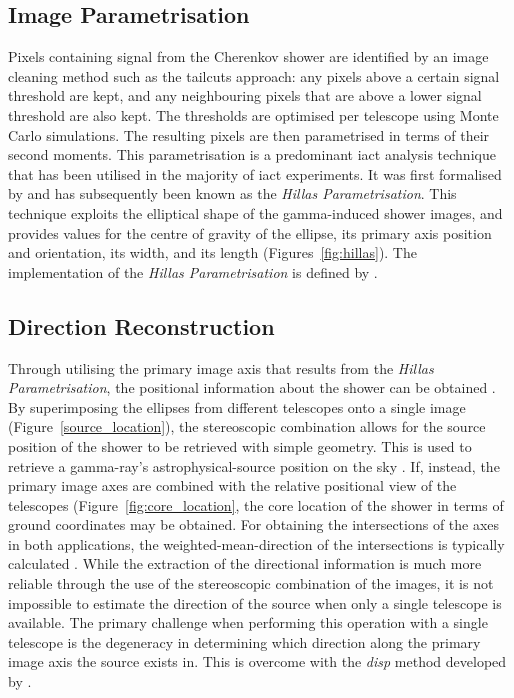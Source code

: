 \subsection{Image Parametrisation} \label{section:image_parametrisation}

Pixels containing signal from the Cherenkov shower are identified by an image cleaning method such as the tailcuts approach: any pixels above a certain signal threshold are kept, and any neighbouring pixels that are above a lower signal threshold are also kept. The thresholds are optimised per telescope using Monte Carlo simulations. The resulting pixels are then parametrised in terms of their second moments. This parametrisation is a predominant \gls{iact} analysis technique that has been utilised in the majority of \gls{iact} experiments. It was first formalised by \textcite{Hillas1985a} and has subsequently been known as the \textit{Hillas Parametrisation}. This technique exploits the elliptical shape of the gamma-induced shower images, and provides values for the centre of gravity of the ellipse, its primary axis position and orientation, its width, and its length (Figures~\ref{fig:hillas}). The  implementation of the \textit{Hillas Parametrisation} is defined by \textcite{Reynolds1993}.

\subsection{Direction Reconstruction}

Through utilising the primary image axis that results from the \textit{Hillas Parametrisation}, the positional information about the shower can be obtained \cite{Daum1997,Cogan2006,Dickinson2010}. By superimposing the ellipses from different telescopes onto a single image (Figure~\ref{source_location}), the stereoscopic combination allows for the source position of the shower to be retrieved with simple geometry. This is used to retrieve a gamma-ray's astrophysical-source position on the sky . If, instead, the primary image axes are combined with the relative positional view of the telescopes (Figure~\ref{fig:core_location}, the core location of the shower in terms of ground coordinates may be obtained. For obtaining the intersections of the axes in both applications, the weighted-mean-direction of the intersections is typically calculated \cite{Eschbach2016,Bernlohr2013a}. While the extraction of the directional information is much more reliable through the use of the stereoscopic combination of the images, it is not impossible to estimate the direction of the source when only a single telescope is available. The primary challenge when performing this operation with a single telescope is the degeneracy in determining which direction along the primary image axis the source exists in. This is overcome with the \textit{disp} method developed by \textcite{Lessard2001}.

